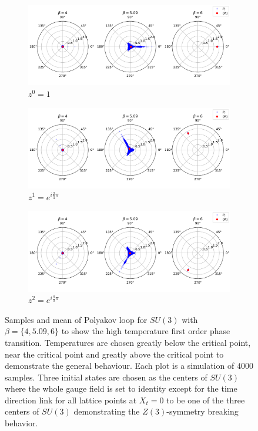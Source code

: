 \documentclass[english,twoside,openright]{UH_TCM_MSc}
\begin{document}
\begin{figure}[htpb]
    \centering
    \begin{subfigure}[t]{\textwidth}
        \centering
        \includegraphics[width=\textwidth]{final_plots/order_parameter/z0.pdf}
        \caption{$z^0=1$}
    \end{subfigure}
    \begin{subfigure}[t]{\textwidth}
        \centering
        \includegraphics[width=\textwidth]{final_plots/order_parameter/z1.pdf}
        \caption{$z^1=e^{i\frac{2}{3}\pi}$}
    \end{subfigure}
    \begin{subfigure}[t]{\textwidth}
        \centering
        \includegraphics[width=\textwidth]{final_plots/order_parameter/z2.pdf}
        \caption{$z^2=e^{i\frac{4}{3}\pi}$}
    \end{subfigure}
    \caption{Samples and mean of Polyakov loop for $SU(3)$ with $\beta = \{4,5.09,6\}$ to show the high temperature first order phase transition. Temperatures are chosen greatly below the critical point, near the critical point and greatly above the critical point to demonstrate the general behaviour. Each plot is a simulation of $4000$ samples.  Three initial states are chosen as the centers of $SU(3)$ where the whole gauge field is set to identity except for the time direction link for all lattice points at $X_t = 0$ to be one of the three centers of $SU(3)$ demonstrating the $Z(3)$-symmetry breaking behavior.}
    \label{fig:polyakov}
\end{figure}
\end{document}
